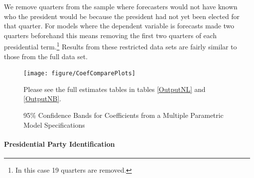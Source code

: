 \documentclass[a4paper]{article}
\begin{document}
We remove quarters from the sample where forecasters would not have known who the president would be because the president had not yet been elected for that quarter. For models where the dependent variable is forecasts made two quarters beforehand this means removing the first two quarters of each presidential term.\footnote{In this case 19 quarters are removed.} Results from these restricted data sets are fairly similar to those from the full data set.




\begin{figure}[t]
    \caption{95\% Confidence Bands for Coefficients from a Multiple Parametric Model Specifications}
    \label{CoefComparePlots}
    \begin{center}

\begin{knitrout}
\color{fgcolor}

{\centering \texttt{[image: figure/CoefComparePlots]} 

}



\end{knitrout}

    \end{center}
    \begin{singlespace}
        {\scriptsize{Please see the full estimates tables in tables \ref{OutputNL} and \ref{OutputNB}.}}
    \end{singlespace}
\end{figure}

\paragraph{Presidential Party Identification}
\end{document}
